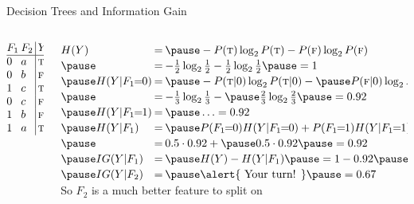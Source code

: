 \documentclass[14pt]{beamer}
\begin{document}
\begin{frame}{Decision Trees and Information Gain}
	\textbf{}
	\pause
	\medskip
	\begin{columns}[T]
		\begin{column}{0.6in}
			\small
			$
			\begin{array}{@{}l@{\hspace{2pt}}l@{\hspace{2pt}}|@{\hspace{2pt}}l@{}}
				F_1 & F_2 & Y \\
				\hline
				0   & a   & \textsc{t} \\
				0   & b   & \textsc{f} \\
				1   & c   & \textsc{t} \\
				0   & c   & \textsc{f} \\
				1   & b   & \textsc{f} \\
				1   & a   & \textsc{t} \\
			\end{array}
			$
		\end{column}
		\pause
		\begin{column}{3.8in}
			\small
			$
			\extrarowheight=2pt
			\begin{array}{@{}l@{\hspace{2pt}}l@{\hspace{2pt}}l@{}}
				H(Y)               & = & \pause -P(\textsc{t})\log_2 P(\textsc{t}) - P(\textsc{f})\log_2 P(\textsc{f}) \\
				\pause
				                   & = & -\frac{1}{2}\log_2 \frac{1}{2} - \frac{1}{2}\log_2 \frac{1}{2} \pause = 1 \\
				\pause
				H(Y|F_1\!\!=\!\!0) & = & \pause -P(\textsc{t}|0)\log_2 P(\textsc{t}|0) - \pause P(\textsc{f}|0)\log_2 P(\textsc{f}|0) \\
				\pause
				                   & = & - \frac{1}{3}\log_2 \frac{1}{3} - \pause \frac{2}{3}\log_2 \frac{2}{3} \pause = 0.92\\
				\pause         
				H(Y|F_1\!\!=\!\!1) & = & \pause \ldots = 0.92\\
				\pause         
				H(Y|F_1)           & = & \pause P(F_1\!\!=\!\!0) H(Y|F_1\!\!=\!\!0) + P(F_1\!\!=\!\!1) H(Y|F_1\!\!=\!\!1) \\
				\pause         
				                   & = & 0.5 \cdot 0.92 + \pause 0.5 \cdot 0.92 \pause = 0.92 \\
				\pause
				IG(Y|F_1)          & = & \pause H(Y) - H(Y|F_1) \pause = 1 - 0.92 \pause = 0.08 \\
				\pause         
				IG(Y|F_2)          & = & \pause \mbox{\alert{ Your turn! }} \pause = 0.67 \\
			\end{array}
			$ \\
			\medskip
			\pause
			So $F_2$ is a much better feature to split on \hyperlink{decision-tree-exercise<2>}{}
		\end{column}
	\end{columns}
\end{frame}
\end{document}

